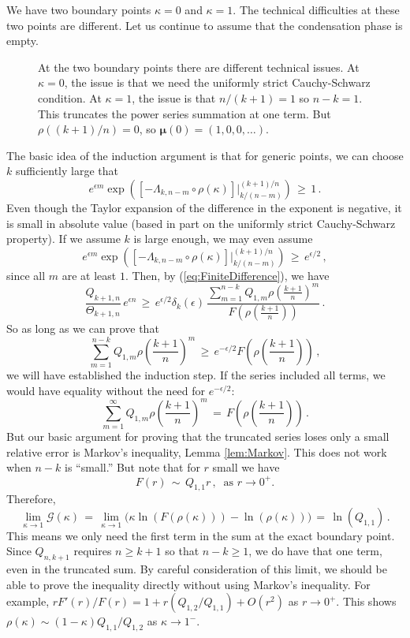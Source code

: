 \documentclass[12pt]{article}
\begin{document}
We have two boundary points $\kappa=0$ and $\kappa=1$.
The technical difficulties at these two points are different.
Let us continue to assume that the condensation phase is empty.
\begin{figure}
\begin{center}
\end{center}
\caption{At the two boundary points there are different technical issues.
At $\kappa=0$, the issue is that we need the uniformly strict Cauchy-Schwarz condition.
At $\kappa=1$, the issue is that $n/(k+1)=1$ so $n-k=1$. This truncates the power series summation at one term.
But $\rho((k+1)/n)=0$, so $\boldsymbol{\mu}(0) = (1,0,0,\dots)$.
\label{fig:1}
}
\end{figure}
The basic idea of the induction argument is that for generic points, we can choose $k$ sufficiently large that
$$
e^{\epsilon m}
\exp\left(\left[ -\Lambda_{k,n-m}\circ \rho(\kappa)\right]\Bigg|_{k/(n-m)}^{(k+1)/n}\right)\, 
\geq\, 1\, .
$$
Even though the Taylor expansion of the difference in the exponent is negative, it is small in absolute value
(based in part on the uniformly strict Cauchy-Schwarz property).
If we assume $k$ is large enough, we may even assume
$$
e^{\epsilon m}
\exp\left(\left[ -\Lambda_{k,n-m}\circ \rho(\kappa)\right]\Bigg|_{k/(n-m)}^{(k+1)/n}\right)\, 
\geq\, e^{\epsilon/2}\, ,
$$
since all $m$ are at least $1$.
Then, by (\ref{eq:FiniteDifference}), we have 
$$
\frac{Q_{k+1,n}}{\Theta_{k+1,n}}\, e^{\epsilon n}\,
\geq\, e^{\epsilon/2} \delta_k(\epsilon)\, \frac{\sum_{m=1}^{n-k} Q_{1,m} \rho\left(\frac{k+1}{n}\right)^m}
{F\left(\rho\left(\frac{k+1}{n}\right)\right)}\, .
$$
So as long as we can prove that
$$
\sum_{m=1}^{n-k} Q_{1,m}  \rho\left(\frac{k+1}{n}\right)^m\, \geq\, e^{-\epsilon/2} F\left(\rho\left(\frac{k+1}{n}\right)\right)\, ,
$$
we will have established the induction step.
If the series included all terms, we would have equality without the need for $e^{-\epsilon/2}$:
$$
\sum_{m=1}^{\infty} Q_{1,m}  \rho\left(\frac{k+1}{n}\right)^m\, =\, F\left(\rho\left(\frac{k+1}{n}\right)\right)\, .
$$
But our basic argument for proving that the truncated series loses only a small relative error is Markov's inequality,
Lemma \ref{lem:Markov}.
This does not work when $n-k$ is ``small.''
But note that for $r$ small we have 
$$
F(r)\, \sim\, Q_{1,1} r\, ,\ \text{ as $r \to 0^+$.}
$$
Therefore,
$$
\lim_{\kappa \to 1} \mathcal{G}(\kappa)\, 
=\, \lim_{\kappa \to 1} \Big(\kappa \ln(F(\rho(\kappa))) - \ln(\rho(\kappa))\Big)\, =\, \ln(Q_{1,1})\, .
$$
This means we only need the first term in the sum at the exact boundary point.
Since $Q_{n,k+1}$ requires $n\geq k+1$ so that $n-k\geq 1$, we do have that one term, even in the truncated sum.
By careful consideration of this limit, we should be able to prove the inequality directly without using Markov's inequality.
For example, $r F'(r)/F(r) = 1 + r (Q_{1,2}/Q_{1,1}) + O(r^2)$ as $r\to 0^+$. 
This shows
$\rho(\kappa) \sim (1-\kappa)Q_{1,1}/Q_{1,2}$ as $\kappa \to 1^-$.
\end{document}
